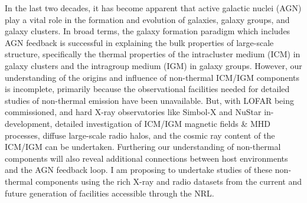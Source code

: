 \documentclass[12pt]{article}
\begin{document}
In the last two decades, it has become apparent that active galactic
nuclei (AGN) play a vital role in the formation and evolution of
galaxies, galaxy groups, and galaxy clusters. In broad terms, the
galaxy formation paradigm which includes AGN feedback is successful in
explaining the bulk properties of large-scale structure, specifically
the thermal properties of the intracluster medium (ICM) in galaxy
clusters and the intragroup medium (IGM) in galaxy groups. However,
our understanding of the origins and influence of non-thermal ICM/IGM
components is incomplete, primarily because the observational
facilities needed for detailed studies of non-thermal emission have
been unavailable. But, with LOFAR being commissioned, and hard X-ray
observatories like Simbol-X and NuStar in-development, detailed
investigation of ICM/IGM magnetic fields \& MHD processes, diffuse
large-scale radio halos, and the cosmic ray content of the ICM/IGM can
be undertaken. Furthering our understanding of non-thermal components
will also reveal additional connections between host environments and
the AGN feedback loop. I am proposing to undertake studies of these
non-thermal components using the rich X-ray and radio datasets from
the current and future generation of facilities accessible through the
NRL.
\end{document}
